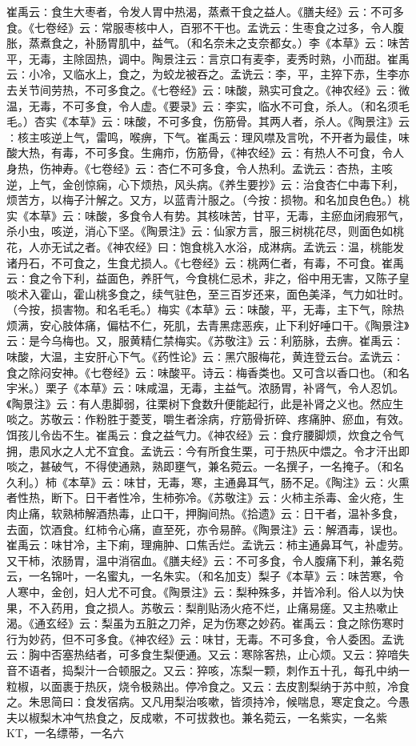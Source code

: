 \documentclass[a4paper,12pt,UTF8,twoside]{ctexbook}
\begin{document}
崔禹云∶食生大枣者，令发人胃中热渴，蒸煮干食之益人。《膳夫经》云∶不可多食。《七卷经》云∶常服枣核中人，百邪不干也。孟诜云∶生枣食之过多，令人腹胀，蒸煮食之，补肠胃肌中，益气。（和名奈未之支奈都女。）李《本草》云∶味苦平，无毒，主除固热，调中。陶景注云∶言京口有麦李，麦秀时熟，小而甜。崔禹云∶小冷，又临水上，食之，为蛟龙被吞之。孟诜云∶李，平，主猝下赤，生李亦去关节间劳热，不可多食之。《七卷经》云∶味酸，熟实可食之。《神农经》云∶微温，无毒，不可多食，令人虚。《要录》云∶李实，临水不可食，杀人。（和名须毛毛。）杏实《本草》云∶味酸，不可多食，伤筋骨。其两人者，杀人。《陶景注》云∶核主咳逆上气，雷鸣，喉痹，下气。崔禹云∶理风噤及言吮，不开者为最佳，味酸大热，有毒，不可多食。生痈疖，伤筋骨，《神农经》云∶有热人不可食，令人身热，伤神寿。《七卷经》云∶杏仁不可多食，令人热利。孟诜云∶杏热，主咳逆，上气，金创惊痫，心下烦热，风头病。《养生要抄》云∶治食杏仁中毒下利，烦苦方，以梅子汁解之。又方，以蓝青汁服之。（今按∶损物。和名加良色色。）桃实《本草》云∶味酸，多食令人有势。其核味苦，甘平，无毒，主瘀血闭瘕邪气，杀小虫，咳逆，消心下坚。《陶景注》云∶仙家方言，服三树桃花尽，则面色如桃花，人亦无试之者。《神农经》曰∶饱食桃入水浴，成淋病。孟诜云∶温，桃能发诸丹石，不可食之，生食尤损人。《七卷经》云∶桃两仁者，有毒，不可食。崔禹云∶食之令下利，益面色，养肝气，今食桃仁忌术，非之，俗中用无害，又陈子皇啖术入霍山，霍山桃多食之，续气驻色，至三百岁还来，面色美泽，气力如壮时。（今按，损害物。和名毛毛。）梅实《本草》云∶味酸，平，无毒，主下气，除热烦满，安心肢体痛，偏枯不仁，死肌，去青黑痣恶疾，止下利好唾口干。《陶景注》云∶是今乌梅也。又，服黄精仁禁梅实。《苏敬注》云∶利筋脉，去痹。崔禹云∶味酸，大温，主安肝心下气。《药性论》云∶黑穴服梅花，黄连登云台。孟诜云∶食之除闷安神。《七卷经》云∶味酸平。诗云∶梅香类也。又可含以香口也。（和名宇米。）栗子《本草》云∶味咸温，无毒，主益气。浓肠胃，补肾气，令人忍饥。《陶景注》云∶有人患脚弱，往栗树下食数升便能起行，此是补肾之义也。然应生啖之。苏敬云∶作粉胜于菱芰，嚼生者涂病，疗筋骨折碎、疼痛肿、瘀血，有效。饵孩儿令齿不生。崔禹云∶食之益气力。《神农经》云∶食疗腰脚烦，炊食之令气拥，患风水之人尤不宜食。孟诜云∶今有所食生栗，可于热灰中煨之。令才汗出即啖之，甚破气，不得使通熟，熟即壅气，兼名菀云。一名撰子，一名掩子。（和名久利。）柿《本草》云∶味甘，无毒，寒，主通鼻耳气，肠不足。《陶注》云∶火熏者性热，断下。日干者性冷，生柿弥冷。《苏敬注》云∶火柿主杀毒、金火疮，生肉止痛，软熟柿解酒热毒，止口干，押胸间热。《拾遗》云∶日干者，温补多食，去面，饮酒食。红柿令心痛，直至死，亦令易醉。《陶景注》云∶解酒毒，误也。崔禹云∶味甘冷，主下痢，理痈肿、口焦舌烂。孟诜云∶柿主通鼻耳气，补虚劳。又干柿，浓肠胃，温中消宿血。《膳夫经》云∶不可多食，令人腹痛下利，兼名菀云，一名锦叶，一名蜜丸，一名朱实。（和名加支）梨子《本草》云∶味苦寒，令人寒中，金创，妇人尤不可食。《陶景注》云∶梨种殊多，并皆冷利。俗人以为快果，不入药用，食之损人。苏敬云∶梨削贴汤火疮不烂，止痛易瘥。又主热嗽止渴。《通玄经》云∶梨虽为五脏之刀斧，足为伤寒之妙药。崔禹云∶食之除伤寒时行为妙药，但不可多食。《神农经》云∶味甘，无毒。不可多食，令人委困。孟诜云∶胸中否塞热结者，可多食生梨便通。又云∶寒除客热，止心烦。又云∶猝喑失音不语者，捣梨汁一合顿服之。又云∶猝咳，冻梨一颗，刺作五十孔，每孔中纳一粒椒，以面裹于热灰，烧令极熟出。停冷食之。又云∶去皮割梨纳于苏中煎，冷食之。朱思简曰∶食发宿病。又凡用梨治咳嗽，皆须持冷，候喘息，寒定食之。今愚夫以椒梨木冲气热食之，反成嗽，不可拔救也。兼名菀云，一名紫实，一名紫KT，一名缥蒂，一名六
\end{document}
